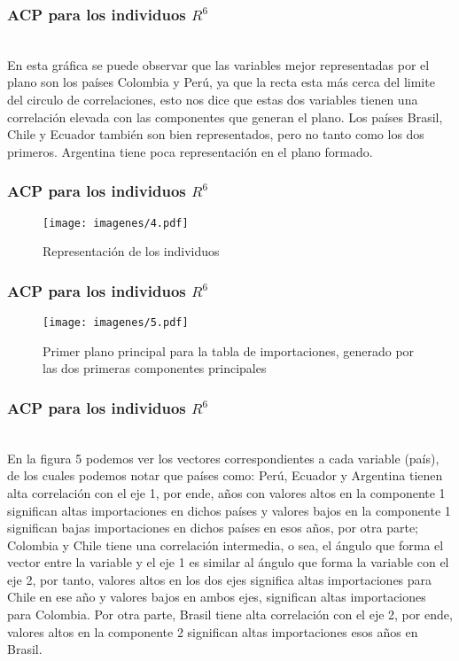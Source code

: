 \documentclass[12pt]{beamer}
\begin{document}
\begin{frame}
\frametitle{ACP para los individuos $R^6$}
~\\En esta gráfica se puede observar que las variables mejor representadas por el plano son los países Colombia y Perú, ya que la recta esta más cerca del limite del circulo de correlaciones, esto nos dice que estas dos variables tienen una correlación elevada con las componentes que generan el plano. Los países Brasil, Chile y Ecuador también son bien representados, pero no tanto como los dos primeros. Argentina tiene poca representación en el plano formado.
\end{frame}

\begin{frame}
\frametitle{ACP para los individuos $R^6$}
\begin{figure}[h!]
  \centering
  \texttt{[image: imagenes/4.pdf]}
  \caption{Representación de los individuos}\label{figura1}
\end{figure}
\end{frame}

\begin{frame}
\frametitle{ACP para los individuos $R^6$}
\begin{figure}[h]
  \centering
  \texttt{[image: imagenes/5.pdf]}
  \caption{Primer plano principal para la tabla de importaciones, generado por las dos
primeras componentes principales}\label{figura1}
\end{figure}
\end{frame}

\begin{frame}
\frametitle{ACP para los individuos $R^6$}
~\\En la figura 5 podemos ver los vectores correspondientes a cada variable (país), de los cuales podemos notar que países como: Perú, Ecuador y Argentina tienen alta correlación con el eje 1, por ende, años con valores altos en la componente 1 significan altas importaciones en dichos países y valores bajos en la componente 1 significan bajas importaciones en dichos países en esos años, por otra parte; Colombia y Chile tiene una correlación intermedia, o sea, el ángulo que forma el vector entre la variable y el eje 1 es similar al ángulo que forma la variable con el eje 2, por tanto, valores altos en los dos ejes significa altas importaciones para Chile en ese año y valores bajos en ambos ejes, significan altas importaciones para Colombia. Por otra parte, Brasil tiene alta correlación con el eje 2, por ende, valores altos en la componente 2 significan altas importaciones esos años en Brasil.
\end{frame}
\end{document}
